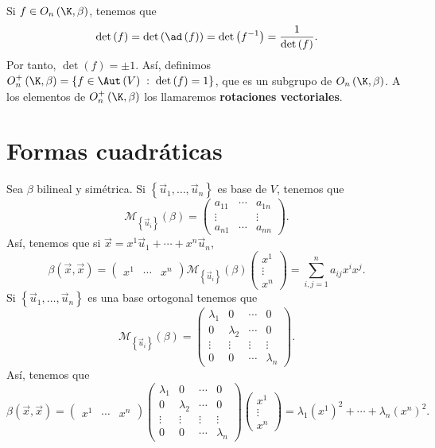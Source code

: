 Si $\displaystyle f \in O_{n}\left(\K, \beta \right) $, tenemos que 
\[ \det\left(f\right) = \det\left(\ad\left(f\right)\right) = \det\left(f^{-1}\right) = \frac{1}{\det\left(f\right)} .\]
Por tanto, $\displaystyle \det\left(f\right) = \pm1 $. Así, definimos $\displaystyle O_{n}^{+}\left(\K, \beta \right) = \left\{ f \in \Aut\left(V\right) \; : \; \det\left(f\right)=1\right\}  $, que es un subgrupo de $\displaystyle O_{n}\left(\K, \beta \right) $. A los elementos de $\displaystyle O^{+}_{n}\left(\K, \beta \right) $ los llamaremos \textbf{rotaciones vectoriales}. 
\section{Formas cuadráticas}
Sea $\displaystyle \beta  $ bilineal y simétrica. Si $\displaystyle \left\{ \vec{u}_{1}, \ldots, \vec{u}_{n}\right\}  $ es base de $\displaystyle V $, tenemos que 
\[ \mathcal{M}_{ \left\{ \vec{u}_{i}\right\} }\left(\beta \right)= \begin{pmatrix} a_{11} & \cdots & a_{1n}\\
\vdots & & \vdots \\
a_{n1} & \cdots & a_{nn}\end{pmatrix} .\]
Así, tenemos que si $\displaystyle \vec{x} = x^{1}\vec{u}_{1} + \cdots + x^{n}\vec{u}_{n} $, 
	\[\beta\left(\vec{x}, \vec{x}\right) = \begin{pmatrix} x^{1} & \cdots & x^{n} \end{pmatrix}\mathcal{M}_{ \left\{ \vec{u}_{i}\right\} }\left(\beta \right) \begin{pmatrix} x^{1} \\ \vdots \\ x^{n} \end{pmatrix} = \sum^{n}_{i,j = 1}a_{ij}x^{i}x^{j}.\]
 Si $\displaystyle \left\{ \vec{u}_{1}, \ldots, \vec{u}_{n}\right\}  $ es una base ortogonal tenemos que 
	\[ \mathcal{M}_{ \left\{ \vec{u}_{i}\right\} }\left(\beta \right) = \begin{pmatrix} \lambda_{1} & 0 & \cdots & 0 \\
	0 & \lambda_{2} & \cdots & 0 \\
\vdots & \vdots & \vdots & \vdots \\
0 & 0 & \cdots & \lambda_{n}\end{pmatrix} .\]
	Así, tenemos que 
		\[\beta\left(\vec{x}, \vec{x}\right) = \begin{pmatrix} x^{1} & \cdots & x^{n} \end{pmatrix}\begin{pmatrix} \lambda_{1} & 0 & \cdots & 0 \\
	0 & \lambda_{2} & \cdots & 0 \\
\vdots & \vdots & \vdots & \vdots \\
0 & 0 & \cdots & \lambda_{n}\end{pmatrix}\begin{pmatrix} x^{1} \\ \vdots \\ x^{n} \end{pmatrix} = \lambda_{1}\left(x^{1}\right)^{2} + \cdots + \lambda_{n}\left(x^{n}\right)^{2} .\]
